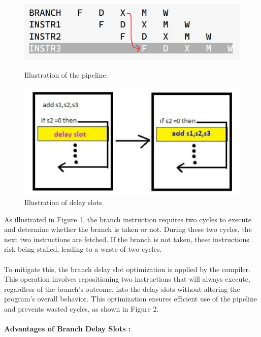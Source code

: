 \documentclass[a4paper,12pt]{article}
\begin{document}
\begin{figure}[H]
\centering
\begin{minipage}{0.45\textwidth}
    \centering
    \includegraphics[width=\textwidth]{figure2.png}
    \caption{Illustration of the pipeline.}
    \label{fig:image2}
\end{minipage}%
\hfill %
\begin{minipage}{0.45\textwidth}
    \centering
    \includegraphics[width=\textwidth]{figure1.jpg}
    \caption{Illustration of delay slots.}
    \label{fig:image1}
\end{minipage}
\end{figure}%
As illustrated in Figure 1, the branch instruction requires two cycles to execute and determine whether the branch is taken or not. During these two cycles, the next two instructions are fetched. If the branch is not taken, these instructions risk being stalled, leading to a waste of two cycles.\\
\\
%
To mitigate this, the branch delay slot optimization is applied by the compiler. This operation involves repositioning two instructions that will always execute, regardless of the branch's outcome, into the delay slots without altering the program's overall behavior. This optimization ensures efficient use of the pipeline and prevents wasted cycles, as shown in Figure 2.\\
\\
%
\textbf{Advantages of Branch Delay Slots :}\\
\end{document}

